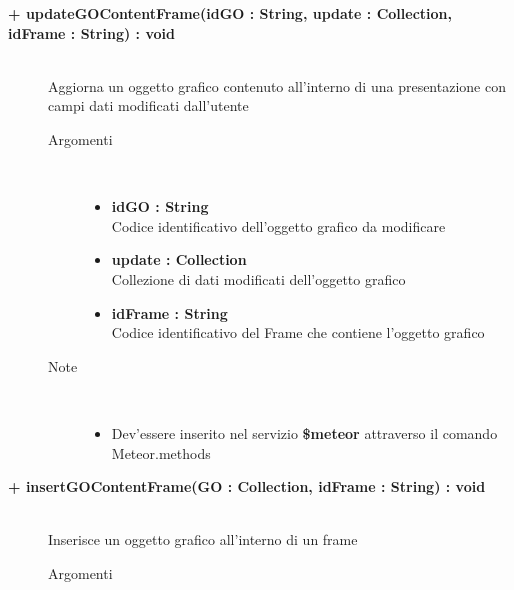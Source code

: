 \begin{description}
	\begin{description}
		\item[\textbf{\color{blue}+ updateGOContentFrame(idGO : String, update : Collection, idFrame : String) : void			}] \hfill \\
			Aggiorna un oggetto grafico contenuto all'interno di una presentazione con  campi dati modificati dall'utente
			
		\begin{description}
			\item[Argomenti] \hfill \\
				\begin{itemize}
				
					\item \textbf{idGO : String			} \hfill \\
					Codice identificativo dell'oggetto grafico da modificare
					\item \textbf{update : Collection			} \hfill \\
					Collezione di dati modificati dell'oggetto grafico
					\item \textbf{idFrame :  String		} \hfill \\
					Codice identificativo del Frame che contiene l'oggetto grafico
					
				\end{itemize}
			\item[Note] \hfill \\
			\begin{itemize}
					\item Dev'essere inserito nel servizio \textbf{\$meteor} attraverso il comando Meteor.methods
				\end{itemize}
		\end{description}
	\end{description}
	
	\begin{description}
		\item[\textbf{\color{blue}+ insertGOContentFrame(GO : Collection, idFrame : String) : void			}] \hfill \\
			Inserisce un oggetto grafico all'interno di un frame
			
		\begin{description}
			\item[Argomenti] \hfill \\
				\begin{itemize}
				

\end{itemize}
\end{description}
\end{description}
\end{description}

